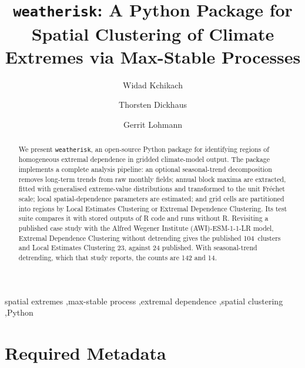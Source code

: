 \documentclass[preprint,12pt,a4paper]{elsarticle}
\begin{document}
\begin{frontmatter}

\title{\texttt{weatherisk}: A Python Package for Spatial Clustering
  of Climate Extremes via Max-Stable Processes}

\author[awi,stat]{Widad Kchikach}

\author[stat]{Thorsten Dickhaus}
\author[awi,phys]{Gerrit Lohmann}

\address[awi]{Alfred Wegener Institute Helmholtz Centre for Polar
  and Marine Research, Am Handelshafen 12, 27570 Bremerhaven, Germany}
\address[stat]{Institute for Statistics, Faculty of Mathematics and
  Computer Science, University of Bremen, Bibliothekstra\ss{}e 5,
  28359 Bremen, Germany}
\address[phys]{Faculty of Physics and Electrical Engineering,
  University of Bremen, Otto-Hahn-Allee 1, 28359 Bremen, Germany}

\begin{abstract}
We present \texttt{weatherisk}, an open-source Python package for
identifying regions of homogeneous extremal dependence in gridded
climate-model output. The package implements a
complete analysis pipeline: an optional seasonal-trend decomposition
removes long-term trends from raw monthly fields; annual block maxima are
extracted, fitted with generalised extreme-value
distributions and transformed to the unit Fr\'{e}chet scale; local
spatial-dependence parameters are estimated; and grid cells are
partitioned into regions by Local Estimates Clustering or
Extremal Dependence Clustering. Its test suite compares it with
stored outputs of R code and runs without R. Revisiting a published
case study with the Alfred Wegener Institute (AWI)-ESM-1-1-LR
model, Extremal Dependence Clustering without detrending gives
the published 104~clusters and Local Estimates Clustering 23, against
24 published. With seasonal-trend detrending, which that study
reports, the counts are 142 and 14.
\end{abstract}

\begin{keyword}
spatial extremes \sep max-stable process \sep extremal dependence \sep spatial clustering \sep Python
\end{keyword}

\end{frontmatter}

\section*{Required Metadata}
\label{sec:metadata}
\end{document}
